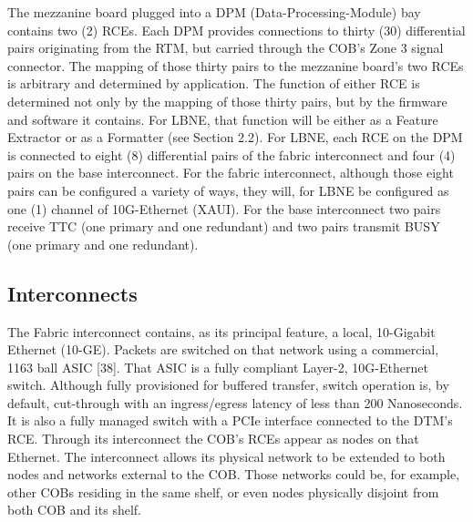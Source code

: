 The mezzanine board plugged into a DPM (Data-Processing-Module) bay contains two (2) RCEs. Each DPM provides connections to thirty (30) differential pairs originating from the RTM, but carried through the COB's Zone 3 signal connector. The mapping of those thirty pairs to the mezzanine board's two RCEs is arbitrary and determined by application. The function of either RCE is determined not only by the mapping of those thirty pairs, but by the firmware and software it contains.
For LBNE, that function will be either as a Feature Extractor or as a Formatter (see Section 2.2).
For LBNE, each RCE on the DPM is connected to eight (8) differential pairs of the fabric interconnect and four (4) pairs on the base interconnect. For the fabric interconnect, although those eight pairs can be configured a variety of ways, they will, for LBNE be configured as one (1) channel of 10G-Ethernet (XAUI). For the base interconnect two pairs receive TTC (one primary and one redundant) and two pairs transmit BUSY (one primary and one redundant).

\subsection{Interconnects}

The Fabric interconnect contains, as its principal feature, a local, 10-Gigabit Ethernet (10-GE). Packets are switched on that network using a commercial, 1163 ball ASIC [38]. That ASIC is a fully compliant Layer-2, 10G-Ethernet switch. Although fully provisioned for buffered transfer, switch operation is, by default, cut-through with an ingress/egress latency of less than 200 Nanoseconds. It is also a fully managed switch with a PCIe interface connected to the DTM's RCE. Through its interconnect the COB's RCEs appear as nodes on that Ethernet. The interconnect allows its physical network to be extended to both nodes and networks external to the COB. Those networks could be, for example, other COBs residing in the same shelf, or even nodes physically disjoint from both COB and its shelf.


